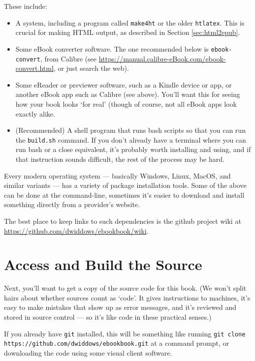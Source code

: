 These include:

\begin{itemize}
\item A \latex system, including a program called \texttt{make4ht} or the older \texttt{htlatex}.
  This is crucial for making HTML output, as described in Section
  \ref{sec:html2epub}.
\item Some eBook converter software. The one recommended below is
  \texttt{ebook-convert}, from Calibre (see
  \url{https://manual.calibre-eBook.com/ebook-convert.html}, or just
  search the web).
\item Some eReader or previewer software, such as a Kindle device or
  app, or another eBook app such as Calibre (see above). You'll want
  this for seeing how your book looks `for real' (though of course,
  not all eBook apps look exactly alike.
\item (Recommended) A shell program that runs bash scripts so that you
  can run the \texttt{build.sh} command. If you don't already have a
  terminal where you can run bash or a close equivalent, it's probably
  worth installing and using, and if that instruction sounds
  difficult, the rest of the process may be hard.
\end{itemize}

Every modern operating system --- basically Windows, Linux, MacOS, and
similar variants --- has a variety of package installation tools.
Some of the above can be done at the command-line, sometimes it's
easier to download and install something directly from a provider's
website.

The best place to keep links to such dependencies is the 
github project wiki at \url{https://github.com/dwiddows/ebookbook/wiki}.

\section{Access and Build the \latex Source}

Next, you'll want to get a copy of the source code for this
book. (We won't split hairs about whether \latex sources count as
`code'. It gives instructions to machines, it's easy to make mistakes
that show up as error messages, and it's reviewed and stored in source
control --- so it's like code in these practical senses.)

If you already have \texttt{git} installed, this will be something
like running \texttt{git clone
  https://github.com/dwiddows/ebookbook.git} at a command prompt, or
downloading the code using some visual client software. 

